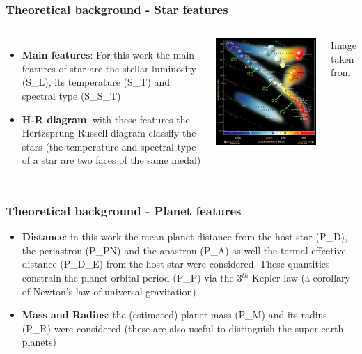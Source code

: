 \documentclass[compress]{beamer}
\begin{document}
\begin{frame}
\frametitle{Theoretical background - Star features }
\begin{columns}
\begin{itemize}
\item \textbf{Main features}: For this work the main features of star are the stellar luminosity (S\_L), its temperature (S\_T) and spectral type (S\_S\_T)
\item\textbf{H-R diagram}: with these features the Hertzsprung-Russell diagram classify the stars (the temperature and spectral type of a star are two faces of the same medal)
\end{itemize}
\includegraphics[width=\linewidth,]{Pic/S_T_T_explanation.png}
\begin{center}
Image taken from \cite{HR_diagram}
\end{center}
\end{columns}
\end{frame}


\begin{frame}
\frametitle{Theoretical background - Planet features }
\begin{itemize}
\item\textbf{Distance}: in this work the mean planet distance from the host star (P\_D), the periastron (P\_PN) and the apastron (P\_A) as well the termal effective distance (P\_D\_E) from the host star  were considered. These quantities constrain the planet orbital period (P\_P) via the 3$^{th}$ Kepler law (a corollary of Newton's law of universal gravitation)
\item\textbf{Mass and Radius}: the (estimated) planet mass (P\_M) and its radius (P\_R) were considered (these are also useful to distinguish the super-earth planets)
\end{itemize}
\end{frame}
 
\end{document}
